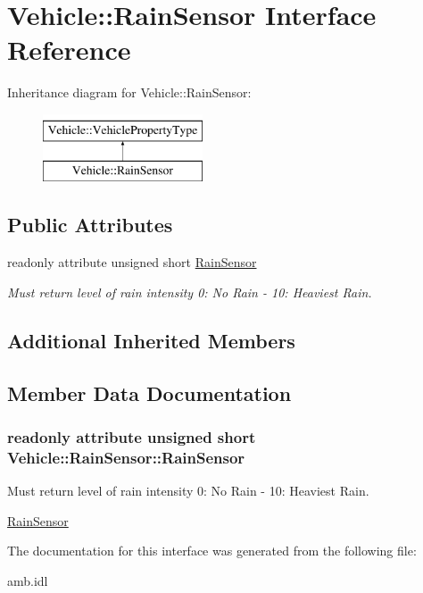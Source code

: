 \hypertarget{interfaceVehicle_1_1RainSensor}{\section{Vehicle\-:\-:Rain\-Sensor Interface Reference}
\label{interfaceVehicle_1_1RainSensor}
}
Inheritance diagram for Vehicle\-:\-:Rain\-Sensor\-:\begin{figure}[H]
\begin{center}
\leavevmode
\includegraphics[height=2.000000cm]{interfaceVehicle_1_1RainSensor}
\end{center}
\end{figure}
\subsection*{Public Attributes}
\begin{DoxyCompactItemize}
\item 
readonly attribute unsigned short \hyperlink{interfaceVehicle_1_1RainSensor_a59ef145996e41388dfe9dd64b3108869}{Rain\-Sensor}
\begin{DoxyCompactList}\small\item\em Must return level of rain intensity 0\-: No Rain -\/ 10\-: Heaviest Rain. \end{DoxyCompactList}\end{DoxyCompactItemize}
\subsection*{Additional Inherited Members}


\subsection{Member Data Documentation}
\hypertarget{interfaceVehicle_1_1RainSensor_a59ef145996e41388dfe9dd64b3108869}{
\subsubsection[{Rain\-Sensor}]{\setlength{\rightskip}{0pt plus 5cm}readonly attribute unsigned short Vehicle\-::\-Rain\-Sensor\-::\-Rain\-Sensor}}\label{interfaceVehicle_1_1RainSensor_a59ef145996e41388dfe9dd64b3108869}


Must return level of rain intensity 0\-: No Rain -\/ 10\-: Heaviest Rain. 

\hyperlink{interfaceVehicle_1_1RainSensor}{Rain\-Sensor} 

The documentation for this interface was generated from the following file\-:\begin{DoxyCompactItemize}
\item 
amb.\-idl\end{DoxyCompactItemize}
